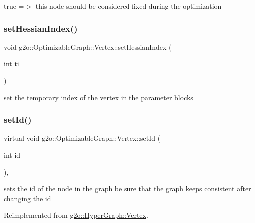 true =$>$ this node should be considered fixed during the optimization 

\mbox{\label{classg2o_1_1_optimizable_graph_1_1_vertex_a440f24c0108be5247f3529369aa1e53c}} 
\subsubsection{\texorpdfstring{set\+Hessian\+Index()}{setHessianIndex()}}
{\footnotesize\ttfamily void g2o\+::\+Optimizable\+Graph\+::\+Vertex\+::set\+Hessian\+Index (\begin{DoxyParamCaption}\item[{int}]{ti }\end{DoxyParamCaption})\hspace{0.3cm}{\ttfamily [inline]}}



set the temporary index of the vertex in the parameter blocks 

\mbox{\label{classg2o_1_1_optimizable_graph_1_1_vertex_ac57651173d6ce4bb4eebf8cb1d917551}} 
\subsubsection{\texorpdfstring{set\+Id()}{setId()}}
{\footnotesize\ttfamily virtual void g2o\+::\+Optimizable\+Graph\+::\+Vertex\+::set\+Id (\begin{DoxyParamCaption}\item[{int}]{id }\end{DoxyParamCaption})\hspace{0.3cm}{\ttfamily [inline]}, {\ttfamily [virtual]}}



sets the id of the node in the graph be sure that the graph keeps consistent after changing the id 



Reimplemented from \mbox{\hyperlink{classg2o_1_1_hyper_graph_1_1_vertex_ac861d25447d8ff167d23c45458f7382f}{g2o\+::\+Hyper\+Graph\+::\+Vertex}}.

